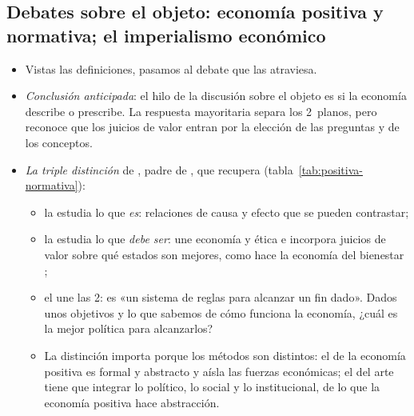 \documentclass[11pt]{article}
\begin{document}
\subsection{Debates sobre el objeto: economía positiva y normativa; el imperialismo económico}\label{sec:positiva-normativa}

\begin{itemize}
\item Vistas las definiciones, pasamos al debate que las atraviesa.
\item \emph{Conclusión anticipada}: el hilo de la discusión sobre el objeto es si la economía describe o prescribe. La respuesta mayoritaria separa los 2~planos, pero reconoce que los juicios de valor entran por la elección de las preguntas y de los conceptos.
\item \emph{La triple distinción} de  \parencite*{KeynesJN1891Scope}, padre de , que recupera \textcite{Colander1992Lost} (tabla~\ref{tab:positiva-normativa}):
  \begin{itemize}
  \item la  estudia lo que \emph{es}: relaciones de causa y efecto que se pueden contrastar;
  \item la  estudia lo que \emph{debe ser}: une economía y ética e incorpora juicios de valor sobre qué estados son mejores, como hace la economía del bienestar ;
  \item el  une las 2: es «un sistema de reglas para alcanzar un fin dado». Dados unos objetivos y lo que sabemos de cómo funciona la economía, ¿cuál es la mejor política para alcanzarlos?
  \end{itemize}
  \begin{itemize}
  \item La distinción importa porque los métodos son distintos: el de la economía positiva es formal y abstracto y aísla las fuerzas económicas; el del arte tiene que integrar lo político, lo social y lo institucional, de lo que la economía positiva hace abstracción\nocite{Colander1992Lost}.
  \end{itemize}
\end{itemize}
\end{document}
